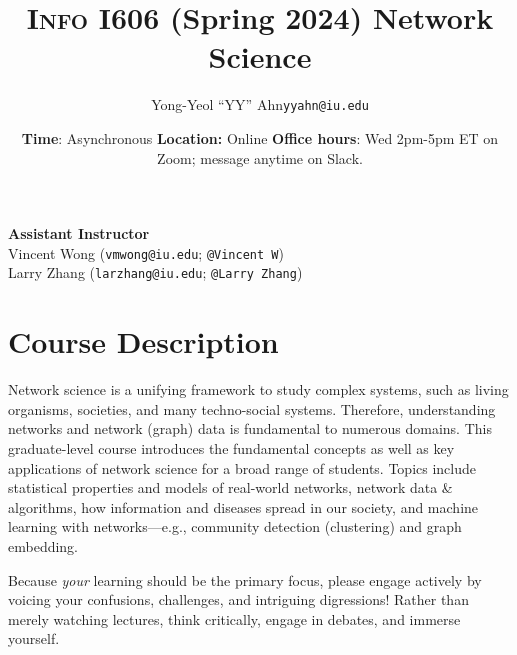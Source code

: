 \documentclass[11pt,article,oneside]{memoir} %
\makeatletter
\def\myauthor{Author}
\def\mytitle{Title}
\def\myemail{yyahn@iu.edu}
\def\myauthor{Yong-Yeol ``YY'' Ahn}
\def\mytitle{{\normalsize \textsc{Info} I606 (Spring 2024) \newline} \HUGE Network Science}
\makeatother
\begin{document}


\def\ind{\hangindent=1 true cm\hangafter=1 \noindent}
\def\labelitemi{$\cdot$}


\title{\LARGE \mytitle}
\author{\Large\myauthor \newline \footnotesize\texttt{\noindent\myemail}}
\date{\textbf{Time}: Asynchronous%
  \newline \textbf{Location:} Online
\newline \textbf{Office hours}: Wed 2pm-5pm ET on Zoom; message anytime on Slack.}

\maketitle
\vspace{-20pt}
{\bfseries Assistant Instructor} \\ 
Vincent Wong (\texttt{vmwong@iu.edu}; \texttt{@Vincent W})\\
Larry Zhang (\texttt{larzhang@iu.edu}; \texttt{@Larry Zhang})\\

\section{Course Description} %

Network science is a unifying framework to study complex systems, such as living organisms, societies, and many techno-social systems. 
Therefore, understanding networks and network (graph) data is fundamental to numerous domains. 
This graduate-level course introduces the fundamental concepts as well as key applications of network science for a broad range of students.
Topics include statistical properties and models of real-world networks, network data \& algorithms, how information and diseases spread in our society, and machine learning with networks---e.g., community detection (clustering) and graph embedding.

Because \emph{your} learning should be the primary focus, please engage actively by voicing your confusions, challenges, and intriguing digressions! Rather than merely watching lectures, think critically, engage in debates, and immerse yourself. 
\end{document}
